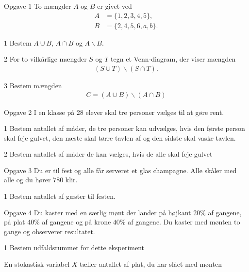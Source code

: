 
\begin{opgavetekst}{Opgave 1}
	To mængder $A$ og $B$ er givet ved
	\begin{align*}
		A &= \{1,2,3,4,5\},  \\
		B &= \{2,4,5,6,a,b\}.
	\end{align*}
\end{opgavetekst}
\begin{delopgave}{}{1}
	Bestem $A \cup B$, $A \cap B$ og $A \backslash B$.
\end{delopgave}
\begin{delopgave}{}{2}
	For to vilkårlige mængder $S$ og $T$ tegn et Venn-diagram, der viser mængden
	\begin{align*}
		(S \cup T) \backslash (S \cap T).
	\end{align*}
\end{delopgave}

\begin{delopgave}{}{3}
	Bestem mængden 
	\begin{align*}
		C = (A \cup B) \backslash (A \cap B)
	\end{align*}
\end{delopgave}


\begin{opgavetekst}{Opgave 2}
	I en klasse på 28 elever skal tre personer vælges til at gøre rent.
\end{opgavetekst}
\begin{delopgave}{}{1}
	Bestem antallet af måder, de tre personer kan udvælges, hvis den første person skal feje 
	gulvet, den næste skal tørre tavlen af og den sidste skal vaske tavlen.
\end{delopgave}
\begin{delopgave}{}{2}
	Bestem antallet af måder de kan vælges, hvis de alle skal feje gulvet
\end{delopgave}

\begin{opgavetekst}{Opgave 3}
	Du er til fest og alle får serveret et glas champagne. Alle skåler med alle og du hører 780
	klir.
\end{opgavetekst}
\begin{delopgave}{}{1}
	Bestem antallet af gæster til festen. 
\end{delopgave}

\newpage

\begin{opgavetekst}{Opgave 4}
	Du kaster med en særlig mønt der lander på højkant 20$\%$ af gangene, på plat $40\%$ af 
	gangene og på krone $40\%$ af gangene. Du kaster med mønten to gange og observerer 
	resultatet.
\end{opgavetekst}
\begin{delopgave}{}{1}
	Bestem udfaldsrummet for dette eksperiment
\end{delopgave}
\begin{meretekst}
	En stokastisk variabel $X$ tæller antallet af plat, du har slået med mønten
\end{meretekst}

